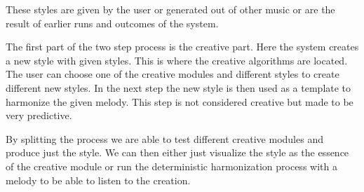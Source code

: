 These styles are given by the user or generated out of other music or are the result of earlier runs and outcomes of the system.

The first part of the two step process is the creative part. Here the system creates a new style with given styles. This is where the creative algorithms are located. The user can choose one of the creative modules and different styles to create different new styles. In the next step the new style is then used as a template to harmonize the given melody. This step is not considered creative but made to be very predictive.

By splitting the process we are able to test different creative modules and produce just the style. We can then either just visualize the style as the essence of the creative module or run the deterministic harmonization process with a melody to be able to listen to the creation. 